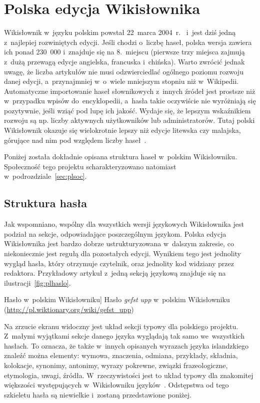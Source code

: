 \section{Polska edycja Wikisłownika}
\label{sec:plwikt}
Wikisłownik w~języku polskim powstał 22~marca 2004~r.~\cite{wikt:home} i~jest dziś jedną z~najlepiej rozwiniętych edycji. Jeśli chodzi o~liczbę haseł, polska wersja zawiera ich ponad 230~000 i~znajduje się na 8.~miejscu (pierwsze trzy miejsca zajmują z~dużą przewagą edycje angielska, francuska i~chińska). Warto zwrócić jednak uwagę, że liczba artykułów nie musi odzwierciedlać ogólnego poziomu rozwoju danej edycji, a~przynajmniej w~o~wiele mniejszym stopniu niż w~Wikipedii. Automatyczne importowanie haseł słownikowych z~innych źródeł jest prostsze niż w~przypadku wpisów do~encyklopedii, a~hasła takie oczywiście nie wyróżniają się pozytywnie, jeśli wziąć pod lupę ich jakość. Wydaje się, że lepszym wskaźnikiem rozwoju są np. liczby aktywnych użytkowników lub administratorów. Tutaj polski Wikisłownik okazuje się wielokrotnie lepszy niż edycje litewska czy malajska, górujące nad nim pod względem liczby haseł~\cite{wikt:list}.

Poniżej została dokładnie opisana struktura haseł w~polskim Wikisłowniku. Społeczność tego projektu scharakteryzowano natomiast w~podrozdziale~\ref{sec:plsoc}.

\subsection{Struktura hasła}
\label{wikt:structure}
Jak wspomniano, wspólny dla wszystkich wersji językowych Wikisłownika jest podział na sekcje, odpowiadające poszczególnym językom. Polska edycja Wikisłownika jest bardzo dobrze ustrukturyzowana w~dalszym zakresie, co niekoniecznie jest regułą dla pozostałych edycji. Wynikiem tego jest jednolity wygląd hasła, który otrzymuje czytelnik, oraz jednolity kod widziany przez redaktora. Przykładowy artykuł z~jedną sekcją językową znajduje się na ilustracji~\ref{fig:plhaslo}.

\begin{illustration}
	\caption
		[Hasło w~polskim Wikisłowniku]
		{Hasło \emph{gefst upp} w~polskim Wikisłowniku (\protect\url{http://pl.wiktionary.org/wiki/gefst_upp})}
	\label{fig:plhaslo}
\end{illustration}

Na zrzucie ekranu widoczny jest układ sekcji typowy dla polskiego projektu. Z~małymi wyjątkami sekcje danego języka wyglądają tak samo we~wszystkich hasłach. To oznacza, że także w~innych opisanych wyrazach języka islandzkiego znaleźć można elementy: wymowa, znaczenia, odmiana, przykłady, składnia, kolokacje, synonimy, antonimy, wyrazy pokrewne, związki frazeologiczne, etymologia, uwagi, źródła. W~rzeczywistości jest to układ typowy dla znakomitej większości występujących w~Wikisłowniku języków~\cite{wikt:zasady}. Odstępstwa od tego szkieletu hasła są niewielkie i~zostaną przedstawione poniżej.

